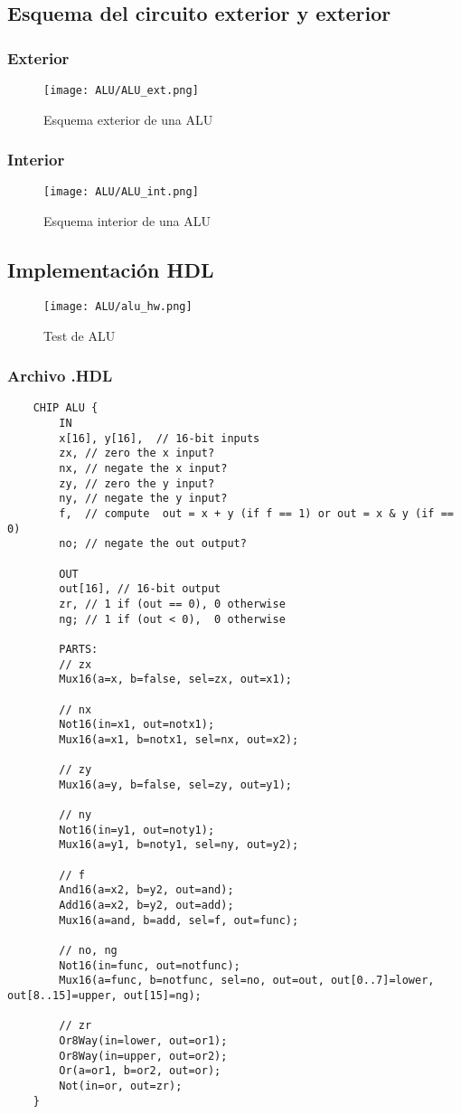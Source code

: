 \documentclass[12pt]{article}
\begin{document}
\subsection{Esquema del circuito exterior y exterior}
\subsubsection{Exterior}
\begin{figure}[H]
	\centering
	\texttt{[image: ALU/ALU\_ext.png]}
	\caption{Esquema exterior de una ALU}
	\label{fig:Inc16}
\end{figure}
\subsubsection{Interior}
\begin{figure}[H]
	\centering
	\texttt{[image: ALU/ALU\_int.png]}
	\caption{Esquema interior de una ALU}
	\label{fig:f_Inc16}
\end{figure}
\subsection{Implementación HDL}
\begin{figure}[H]
	\centering
	\texttt{[image: ALU/alu\_hw.png]}
	\caption{Test de ALU}
	\label{fig:enter-label}
\end{figure}
\subsubsection{Archivo .HDL}
\begin{lstlisting}
	CHIP ALU {
		IN
		x[16], y[16],  // 16-bit inputs
		zx, // zero the x input?
		nx, // negate the x input?
		zy, // zero the y input?
		ny, // negate the y input?
		f,  // compute  out = x + y (if f == 1) or out = x & y (if == 0)
		no; // negate the out output?

		OUT
		out[16], // 16-bit output
		zr, // 1 if (out == 0), 0 otherwise
		ng; // 1 if (out < 0),  0 otherwise

		PARTS:
		// zx
		Mux16(a=x, b=false, sel=zx, out=x1);

		// nx
		Not16(in=x1, out=notx1);
		Mux16(a=x1, b=notx1, sel=nx, out=x2);

		// zy
		Mux16(a=y, b=false, sel=zy, out=y1);

		// ny
		Not16(in=y1, out=noty1);
		Mux16(a=y1, b=noty1, sel=ny, out=y2);

		// f
		And16(a=x2, b=y2, out=and);
		Add16(a=x2, b=y2, out=add);
		Mux16(a=and, b=add, sel=f, out=func);

		// no, ng
		Not16(in=func, out=notfunc);
		Mux16(a=func, b=notfunc, sel=no, out=out, out[0..7]=lower, out[8..15]=upper, out[15]=ng);

		// zr
		Or8Way(in=lower, out=or1);
		Or8Way(in=upper, out=or2);
		Or(a=or1, b=or2, out=or);
		Not(in=or, out=zr);
	}
\end{lstlisting}
\end{document}
